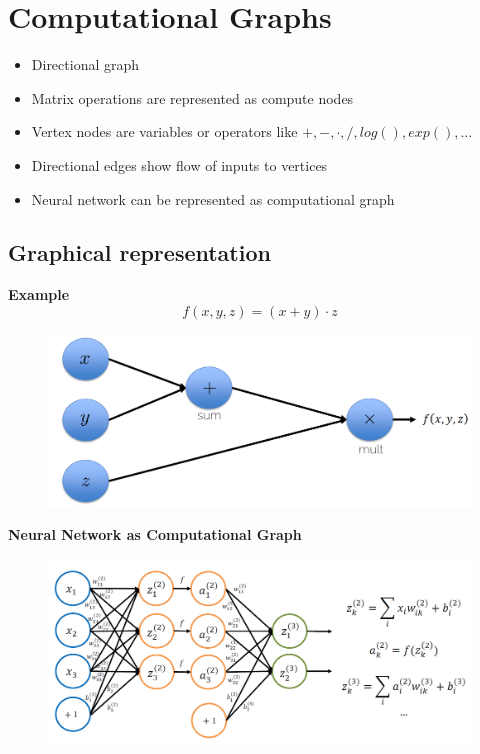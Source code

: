 \documentclass[10pt,a4paper]{article}
\begin{document}
\pagebreak
\section{Computational Graphs}
\begin{itemize}
	\item Directional graph
	\item Matrix operations are represented as compute nodes
	\item Vertex nodes are variables or operators like $+, -, ⋅, /, log(), exp(), \dots$
	\item Directional edges show flow of inputs to vertices
	\item Neural network can be represented as computational graph
\end{itemize}

\subsection{Graphical representation}
\textbf{Example}
$$
	f(x, y, z) = (x + y) ⋅ z
$$
\begin{figure}[H]
	\includegraphics[width=\columnwidth]{figures/comp_graph.png}
\end{figure}

\textbf{Neural Network as Computational Graph}
\begin{figure}[H]
	\includegraphics[width=\columnwidth]{figures/comp_graph_nn.png}
\end{figure}
\end{document}
